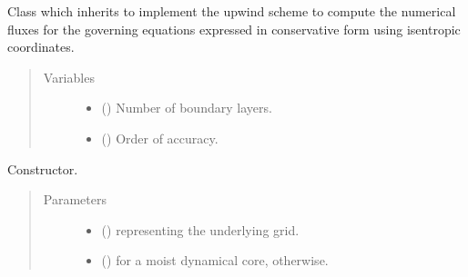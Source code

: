 \documentclass[letterpaper,10pt,english]{sphinxmanual}
\begin{document}
\begin{fulllineitems}
\label{\detokenize{api:tasmania.dycore.flux_isentropic_upwind.FluxIsentropicUpwind}}
Class which inherits {\hyperref[\detokenize{api:tasmania.dycore.flux_isentropic.FluxIsentropic}]{}} to implement the upwind scheme to compute
the numerical fluxes for the governing equations expressed in conservative form using isentropic coordinates.
\begin{quote}\begin{description}
\item[{Variables}] \leavevmode\begin{itemize}
\item {} 
{\hyperref[\detokenize{api:tasmania.dycore.prognostic_isentropic.PrognosticIsentropic.nb}]{}} () \textendash{} Number of boundary layers.

\item {} 
 () \textendash{} Order of accuracy.

\end{itemize}

\end{description}\end{quote}

\begin{fulllineitems}
\label{\detokenize{api:tasmania.dycore.flux_isentropic_upwind.FluxIsentropicUpwind.__init__}}
Constructor.
\begin{quote}\begin{description}
\item[{Parameters}] \leavevmode\begin{itemize}
\item {} 
 () \textendash{} {\hyperref[\detokenize{api:tasmania.grids.grid_xyz.GridXYZ}]{}} representing the underlying grid.

\item {} 
 () \textendash{}  for a moist dynamical core,  otherwise.


\end{itemize}
\end{description}
\end{quote}
\end{fulllineitems}
\end{fulllineitems}
\end{document}

